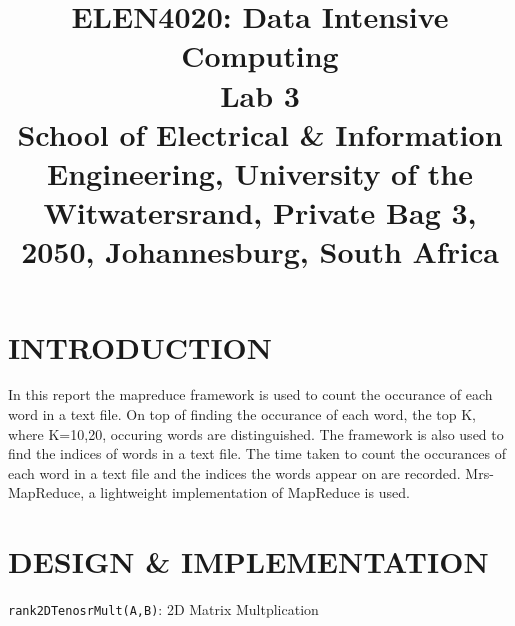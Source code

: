 \documentclass[conference]{IEEEtran}
\begin{document}
\title{ELEN4020: Data Intensive Computing\\ Lab 3\\
{\footnotesize School of Electrical \& Information Engineering, University of the
Witwatersrand, Private Bag 3, 2050, Johannesburg, South Africa}
}


\author{

\and
{}
\and
{}

}

\maketitle

\section{INTRODUCTION}
In this report the mapreduce framework is used to count the occurance of each word in a text file. On top of finding the occurance of each word, the top K, where K=10,20, occuring words are distinguished. The framework is also used to find the indices of words in a text file. The time taken to count the occurances of each word in a text file and the indices the words appear on are recorded. Mrs-MapReduce, a lightweight implementation of MapReduce is used. 



%
\section{DESIGN \& IMPLEMENTATION}

\linesnumbered
\begin{algorithm}

\centring



\caption{\texttt{rank2DTenosrMult(A,B)}: 2D Matrix Multplication}

\Return \C
\label{mult2d}
\end{algorithm}




\end{document}
